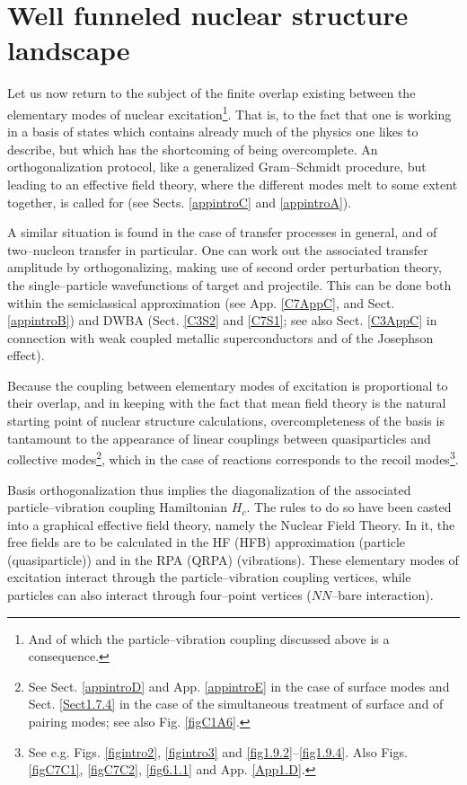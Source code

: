 \section{Well funneled nuclear structure landscape}\label{C1S4}
Let us now return to the subject of the finite overlap existing between the elementary modes of nuclear excitation\footnote{And of which the particle--vibration coupling discussed above is a consequence.}. That is, to the fact that one is working in a basis of states which contains already much of the physics one likes to describe, but which has the shortcoming of being overcomplete. An orthogonalization protocol, like a generalized Gram--Schmidt procedure, but leading to an effective field theory, where the different modes melt to some extent together, is called for (see Sects. \ref{appintroC} and \ref{appintroA}).

A similar situation is found in the case of transfer processes in general, and of two--nucleon transfer in particular. One can work out the associated transfer amplitude by orthogonalizing, making use of second order perturbation theory, the single--particle wavefunctions of target and projectile. This can be done both within the semiclassical approximation (see App. \ref{C7AppC}, and Sect. \ref{appintroB}) and DWBA (Sect. \ref{C3S2} and \ref{C7S1}; see also Sect. \ref{C3AppC} in connection with weak coupled metallic superconductors and of the Josephson effect). 

Because the coupling between elementary modes of excitation is proportional to their overlap, and in keeping with the fact that mean field theory is the natural starting point of nuclear structure calculations, overcompleteness of the basis is tantamount to the appearance of linear couplings between quasiparticles and collective modes\footnote{See Sect. \ref{appintroD} and App. \ref{appintroE} in the case of surface modes and Sect. \ref{Sect1.7.4} in the case of the simultaneous treatment of surface and of pairing modes; see also Fig. \ref{figC1A6}.}, which in the case of reactions corresponds to the recoil modes\footnote{See e.g. Figs. \ref{figintro2}, \ref{figintro3} and \ref{fig1.9.2}--\ref{fig1.9.4}.  Also Figs.  \ref{figC7C1}, \ref{figC7C2}, \ref{fig6.1.1} and  App. \ref{App1.D}.}.


Basis orthogonalization thus implies the diagonalization of the associated particle--vibration coupling Hamiltonian $H_c$. The rules to do so have been casted into a graphical effective field theory, namely the Nuclear Field Theory. In it, the free fields are to be calculated in the HF (HFB) approximation (particle (quasiparticle)) and in the RPA (QRPA) (vibrations). These elementary modes of excitation interact through the particle--vibration coupling vertices, while particles can also interact through four--point vertices ($NN$--bare interaction).


